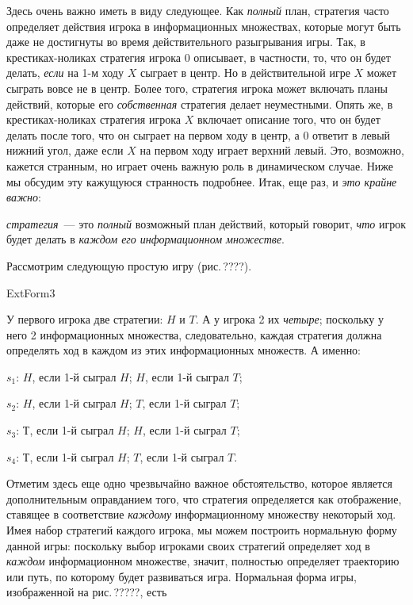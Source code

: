 Здесь очень важно иметь в виду следующее. Как {\it полный} план,
стратегия часто определяет действия игрока в информационных
множествах, которые могут быть даже не достигнуты во время
действительного разыгрывания игры. Так, в крестиках-ноликах
стратегия игрока $0$ описывает, в частности, то, что он будет
делать, \emph{если} на 1-м ходу $X$ сыграет в центр. Но в
действительной игре $X$ может сыграть вовсе не в центр.  Более
того, стратегия игрока может включать планы действий, которые его
{\it собственная} стратегия делает неуместными. Опять же, в
крестиках-ноликах стратегия игрока $X$ включает описание того, что
он будет делать после того, что он сыграет на первом ходу в центр,
а $0$ ответит в левый нижний угол, даже если $X$ на первом ходу
играет верхний левый. Это, возможно, кажется странным, но играет
очень важную роль в динамическом случае. Ниже мы обсудим эту
кажущуюся странность подробнее. Итак, еще раз, и \emph{это крайне
важно}:

{\it стратегия}~--- это {\it полный} возможный план действий,
который говорит, \emph{что} игрок будет делать в {\it каждом его
информационном множестве}.

Рассмотрим следующую простую игру (рис.\,????).


ExtForm3



У первого игрока две стратегии: $H$ и $T$. А у игрока 2 их {\it
четыре}; поскольку у него 2 информационных множества, следовательно,
каждая стратегия должна определять ход в каждом из этих
информационных множеств. А именно:

$s_1$: $H$, если 1-й сыграл $H$; $H$, если 1-й сыграл $T$;

$s_2$: $H$, если 1-й сыграл $H$; $T$, если 1-й сыграл $T$;

$s_3$: $Т$, если 1-й сыграл $H$; $H$, если 1-й сыграл $T$;

$s_4$: $Т$, если 1-й сыграл $H$; $T$, если 1-й сыграл $T$.

Отметим здесь еще одно чрезвычайно важное обстоятельство, которое
является дополнительным оправданием того, что стратегия
определяется как отображение, ставящее в соответствие
\emph{каждому} информационному множеству некоторый ход. Имея набор
стратегий каждого игрока, мы можем построить нормальную форму
данной игры: поскольку выбор игроками своих стратегий определяет
ход в {\it каждом} информационном множестве, значит, полностью
определяет траекторию или путь, по которому будет развиваться
игра. Hормальная форма игры, изображенной на рис.\,?????, есть

